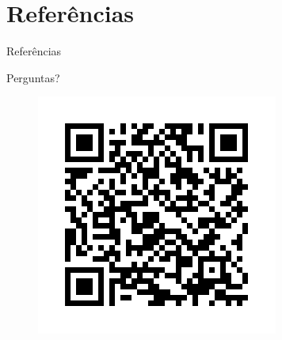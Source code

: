 \documentclass[aspectratio=1610, 10pt]{beamer}
\begin{document}
\section{Referências}

\singlespacing
\begin{frame}[allowframebreaks]{Referências}
    \nocite{*}
    
\end{frame}


\begin{frame}{}
    \begin{center}
        \Huge Perguntas?

        \begin{figure}
            \includegraphics[width = 0.3\linewidth]{fig/qr-code.png}
        \end{figure}

    \end{center}
\end{frame}
\end{document}
